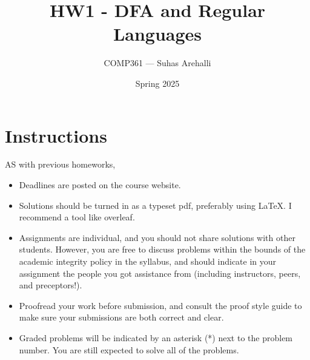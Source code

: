 \documentclass{exam}
\title{HW1 - DFA and Regular Languages}
\author{COMP361 --- Suhas Arehalli}
\date{Spring 2025}
\begin{document}
\maketitle

\section*{Instructions}
AS with previous homeworks, 

\begin{itemize}
    \item Deadlines are posted on the course website.
    \item Solutions should be turned in as a typeset pdf, preferably using LaTeX. I recommend a tool like overleaf. 
    \item Assignments are individual, and you should not share solutions with other students. However, you are free to discuss problems within the bounds of the academic integrity policy in the syllabus, and should indicate in your assignment the people you got assistance from (including instructors, peers, and preceptors!). 
    \item Proofread your work before submission, and consult the proof style guide to make sure your submissions are both correct and clear.
    \item Graded problems will be indicated by an asterisk (*) next to the problem number. You are still expected to solve all of the problems.
\end{itemize}
\end{document}

